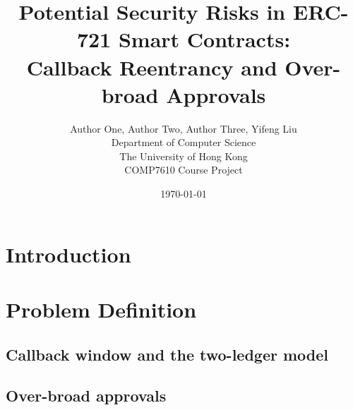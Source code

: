 \documentclass[peerreview]{IEEEtran}
\begin{document}
\title{Potential Security Risks in ERC-721 Smart Contracts:\\
Callback Reentrancy and Over-broad Approvals}

\author{Author One, Author Two, Author Three, Yifeng Liu\\
Department of Computer Science\\
The University of Hong Kong\\
COMP7610 Course Project}
\date{\today}

\maketitle
\tableofcontents
\listoffigures
\listoftables

\IEEEpeerreviewmaketitle

\begin{abstract}
\end{abstract}

\section{Introduction}

\section{Problem Definition}
\subsection{Callback window and the two-ledger model}

\subsection{Over-broad approvals}
\end{document}
